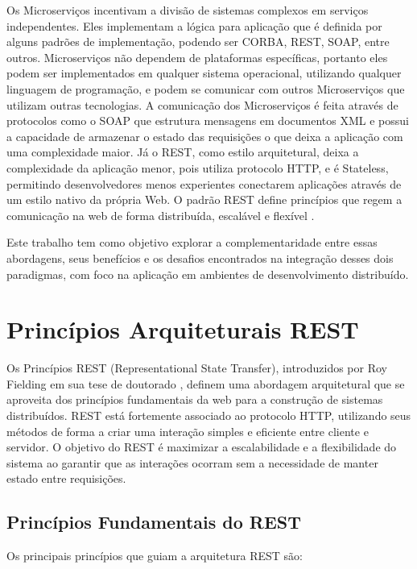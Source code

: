 \documentclass[12pt]{article}
\begin{document}
	Os Microserviços incentivam a divisão de sistemas complexos em serviços independentes. Eles implementam a lógica para aplicação que é definida por alguns padrões de implementação, podendo ser CORBA, REST, SOAP, entre outros. Microserviços não dependem de plataformas específicas, portanto eles podem ser implementados em qualquer sistema operacional, utilizando qualquer linguagem de programação, e podem se comunicar com outros Microserviços que utilizam outras tecnologias. A comunicação dos Microserviços é feita através de protocolos como o SOAP que estrutura mensagens em documentos XML e possui a capacidade de armazenar o estado das requisições o que deixa a aplicação com uma complexidade maior. Já o REST, como estilo arquitetural, deixa a complexidade da aplicação menor, pois utiliza protocolo HTTP, e é Stateless, permitindo desenvolvedores menos experientes conectarem aplicações através de um estilo nativo da própria Web. O padrão REST define princípios que regem a comunicação na web de forma distribuída, escalável e flexível \cite{cavaleiro2013}.
	
	Este trabalho tem como objetivo explorar a complementaridade entre essas abordagens, seus benefícios e os desafios encontrados na integração desses dois paradigmas, com foco na aplicação em ambientes de desenvolvimento distribuído.
	
\section{Princípios Arquiteturais REST}

Os Princípios REST (Representational State Transfer), introduzidos por Roy Fielding em sua tese de doutorado \cite{fielding2000}, definem uma abordagem arquitetural que se aproveita dos princípios fundamentais da web para a construção de sistemas distribuídos. REST está fortemente associado ao protocolo HTTP, utilizando seus métodos de forma a criar uma interação simples e eficiente entre cliente e servidor. O objetivo do REST é maximizar a escalabilidade e a flexibilidade do sistema ao garantir que as interações ocorram sem a necessidade de manter estado entre requisições.

	\subsection{Princípios Fundamentais do REST}
	
	Os principais princípios que guiam a arquitetura REST são:
	
\end{document}
